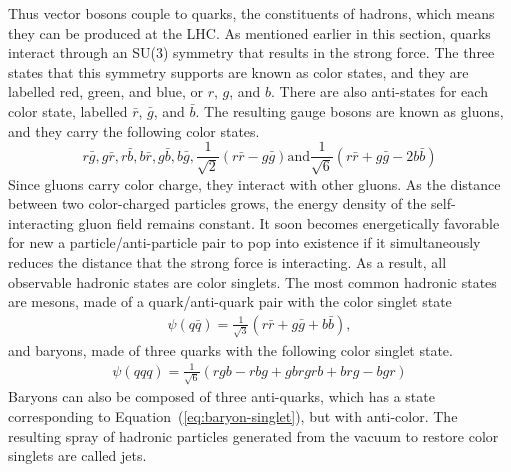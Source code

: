 Thus vector bosons couple to quarks, the constituents of hadrons,
which means they can be produced at the LHC.
As mentioned earlier in this section,
quarks interact through an SU(3) symmetry that results in the strong force.
The three states that this symmetry supports are known as color states,
and they are labelled red, green, and blue, or $r$, $g$, and $b$.
There are also anti-states for each color state,
labelled $\bar{r}$, $\bar{g}$, and $\bar{b}$.
The resulting gauge bosons are known as gluons, and they carry the following color states.
\[
r\bar{g}, g\bar{r}, r\bar{b}, b\bar{r}, g\bar{b}, b\bar{g}, \frac{1}{\sqrt{2}}(r\bar{r} - g\bar{g}) \mathrm{and} \frac{1}{\sqrt{6}}(r\bar{r} + g\bar{g} - 2b\bar{b})
\]
Since gluons carry color charge, they interact with other gluons.
As the distance between two color-charged particles grows,
the energy density of the self-interacting gluon field remains constant.
It soon becomes energetically favorable for new a particle/anti-particle pair
to pop into existence if it simultaneously reduces the distance that the strong force is interacting.
As a result, all observable hadronic states are color singlets.
The most common hadronic states are mesons, made of a quark/anti-quark pair
with the color singlet state
\begin{gather}
  \psi(q\bar{q}) = \frac1{\sqrt{3}} (r\bar{r} + g\bar{g} + b\bar{b}),
\end{gather}
and baryons, made of three quarks with the following color singlet state.
\begin{gather}
  \psi(qqq) = \frac{1}{\sqrt{6}}(rgb - rbg + gbr  grb + brg - bgr) \label{eq:baryon-singlet}
\end{gather}
Baryons can also be composed of three anti-quarks,
which has a state corresponding to Equation~(\ref{eq:baryon-singlet}),
but with anti-color.
The resulting spray of hadronic particles generated from the vacuum to restore
color singlets are called jets.

